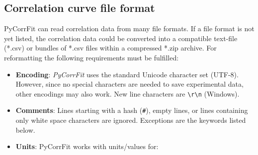 \subsection{Correlation curve file format}
\label{sec:hacke.csv}
PyCorrFit can read correlation data from many file formats.
If a file format is not yet listed, the correlation data could be converted into a compatible text-file (*.csv) or bundles of *.csv files within a compressed *.zip archive. For reformatting the following requirements must be fulfilled:

\begin{itemize}
\item \textbf{Encoding}: \textit{PyCorrFit} uses the standard Unicode character set (UTF-8). However, since no special characters are needed to save experimental data, other encodings may also work. New line characters are \texttt{{\textbackslash}r{\textbackslash}n} (Windows).
\item \textbf{Comments}: Lines starting with a hash (\texttt{\#}), empty lines, or lines containing only white space characters are ignored. Exceptions are the keywords listed below.
\item \textbf{Units}: PyCorrFit works with units/values for:


\end{itemize}
